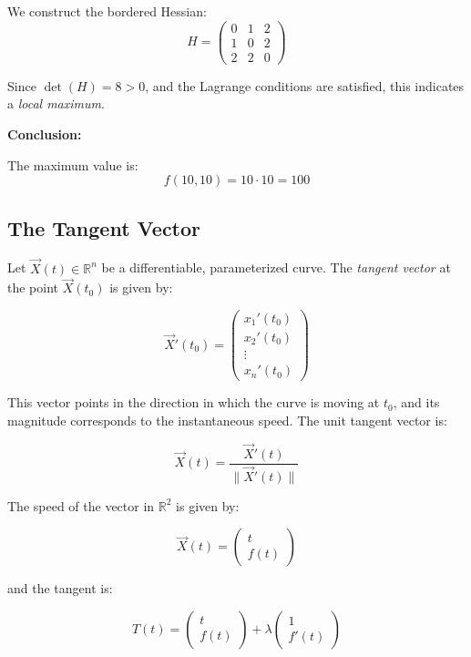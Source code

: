 We construct the bordered Hessian:
\[
H = \begin{pmatrix}
0 & 1 & 2 \\
1 & 0 & 2 \\
2 & 2 & 0
\end{pmatrix}
\]

Since \( \det(H) = 8 > 0 \), and the Lagrange conditions are satisfied, this indicates a \emph{local maximum}.
\vspace{\baselineskip}

\textbf{Conclusion:}
\vspace{\baselineskip}

The maximum value is:
\[
f(10, 10) = 10 \cdot 10 = \boxed{100}
\]


\subsection{The Tangent Vector}

Let \( \vec{X}(t) \in \mathbb{R}^n \) be a differentiable, parameterized curve. The \emph{tangent vector} at the point 
\( \vec{X}(t_0) \) is given by:

\[
\vec{X}'(t_0) = \begin{pmatrix}
    x_1 ' (t_0) \\ x_2 ' (t_0) \\ \vdots \\ x_n ' (t_0)
\end{pmatrix}
\]

This vector points in the direction in which the curve is moving at \( t_0 \), and its magnitude corresponds to the
 instantaneous speed. The unit tangent vector is:

\[
\vec{X}(t) = \frac{\vec{X}'(t)}{\|\vec{X}'(t)\|}
\]

The speed of the vector in \(\mathbb{R}^2\) is given by:

\[
\vec{X}(t) = \begin{pmatrix}
    t \\ f(t)
\end{pmatrix}
\]

and the tangent is:

\[
T(t) = \begin{pmatrix}
    t \\ f(t)
\end{pmatrix} + \lambda \begin{pmatrix}
    1 \\ f'(t)
\end{pmatrix}
\]


